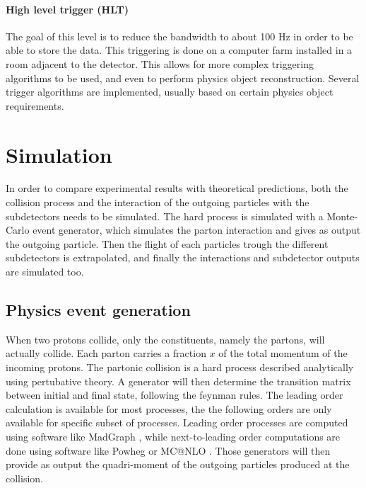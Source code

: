 \paragraph{High level trigger (HLT)} The goal of this level is to reduce the bandwidth to about 100 Hz in order to be able to store the data. This triggering is done on a computer farm installed in a room adjacent to the detector. This allows for more complex triggering algorithms to be used, and even to perform physics object reconstruction. Several trigger algorithms are implemented, usually based on certain physics object requirements.

\section{Simulation}
\label{sec:simulation}

In order to compare experimental results with theoretical predictions, both the collision process and the interaction of the outgoing particles with the subdetectors needs to be simulated. The hard process is simulated with a Monte-Carlo event generator, which simulates the parton interaction and gives as output the outgoing particle. Then the flight of each particles trough the different subdetectors is extrapolated, and finally the interactions and subdetector outputs are simulated too.

\subsection{Physics event generation} 
\label{sec:cms_physics_event_generation}

When two protons collide, only the constituents, namely the partons, will actually collide. Each parton carries a fraction $x$ of the total momentum of the incoming protons. The partonic collision is a hard process described analytically using pertubative theory. A generator will then determine the transition matrix between initial and final state, following the feynman rules. The leading order calculation is available for most processes, the the following orders are only available for specific subset of processes. Leading order processes are computed using software like MadGraph \cite{Alwall2011}, while next-to-leading order computations are done using software like Powheg \cite{Alioli2010} or MC@NLO \cite{Frixione_2002}.
Those generators will then provide as output the quadri-moment of the outgoing particles produced at the collision.

